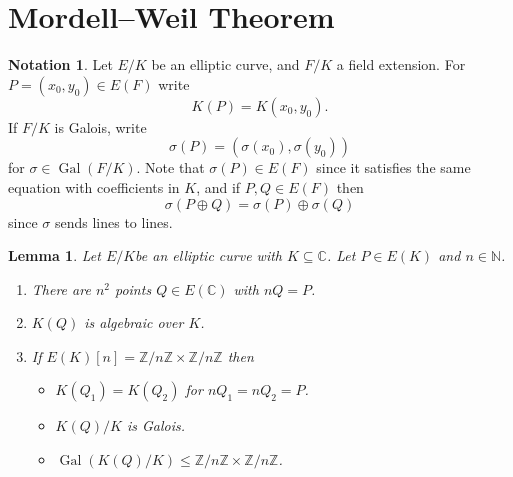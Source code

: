 \documentclass[a4paper]{article}
\newtheorem{lemma}[theorem]{Lemma}
\theoremstyle{definition}
\newtheorem*{notation}{Notation}
\DeclareMathOperator{\Gal}{Gal}
\newcommand{\N}{\mathbb{N}}
\newcommand{\Z}{\mathbb{Z}}
\newcommand{\C}{\mathbb{C}}
\begin{document}
\section{Mordell--Weil Theorem}

\begin{notation}
    Let $E/K$ be an elliptic curve, and $F/K$ a field extension. For
    $P=(x_0,y_0)\in E(F)$ write
    \begin{equation*}
        K(P) = K(x_0,y_0).
    \end{equation*}
    If $F/K$ is Galois, write
    \begin{equation*}
        \sigma(P) = (\sigma(x_0),\sigma(y_0))
    \end{equation*}
    for $\sigma\in\Gal(F/K)$. Note that $\sigma(P)\in E(F)$ since it satisfies
    the same equation with coefficients in $K$, and if $P,Q\in E(F)$ then
    \begin{equation*}
        \sigma(P\oplus Q)=\sigma(P)\oplus\sigma(Q)
    \end{equation*}
    since $\sigma$ sends lines to lines.
\end{notation}

\begin{lemma}
    Let $E/K$be an elliptic curve with $K\subseteq\C$. Let $P\in E(K)$ and
    $n\in\N$.
    \begin{enumerate}[label=(\roman*)]
        \item There are $n^2$ points $Q\in E(\C)$ with $nQ=P$.
        \item $K(Q)$ is algebraic over $K$.
        \item If $E(K)[n]=\Z/n\Z\times\Z/n\Z$ then
            \begin{itemize}
                \item $K(Q_1)=K(Q_2)$ for $nQ_1=nQ_2=P$.
                \item $K(Q)/K$ is Galois.
                \item $\Gal(K(Q)/K)\le\Z/n\Z\times\Z/n\Z$.
            \end{itemize}
    \end{enumerate}
\end{lemma}
\end{document}
